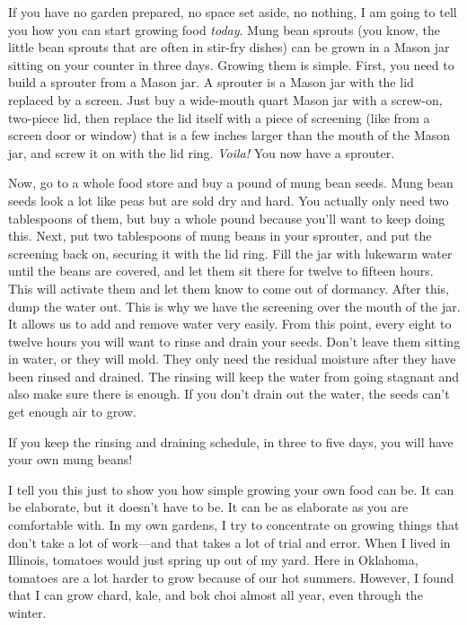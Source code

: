 \begin{infonote}
If you have no garden prepared, no space set aside, no nothing, I am
going to tell you how you can start growing food \textit{today}. Mung
bean sprouts (you know, the little bean sprouts that are often in
stir-fry dishes) can be grown in a Mason jar sitting on your counter in
three days. Growing them is simple. First, you need to build a sprouter
from a Mason jar. A sprouter is a Mason jar with the lid replaced by a
screen. Just buy a wide-mouth quart Mason jar with a screw-on,
two-piece lid, then replace the lid itself with a piece of screening
(like from a screen door or window) that is a few inches larger than
the mouth of the Mason jar, and screw it on with the lid ring.
\textit{Voila!}  You now have a sprouter.

Now, go to a whole food store and buy a pound of mung bean seeds. Mung
bean seeds look a lot like peas but are sold dry and hard. You actually
only need two tablespoons of them, but buy a whole pound because you’ll
want to keep doing this. Next, put two tablespoons of mung beans in
your sprouter, and put the screening back on, securing it with the lid
ring. Fill the jar with lukewarm water until the beans are covered, and
let them sit there for twelve to fifteen hours. This will activate them
and let them know to come out of dormancy. After this, dump the water
out. This is why we have the screening over the mouth of the jar.  It
allows us to add and remove water very easily. From this point, every
eight to twelve hours you will want to rinse and drain your seeds.
Don’t leave them sitting in water, or they will mold. They only need
the residual moisture after they have been rinsed and drained. The
rinsing will keep the water from going stagnant and also make sure
there is enough. If you don’t drain out the water, the seeds can’t get
enough air to grow. 

If you keep the rinsing and draining schedule, in three to five days,
you will have your own mung beans!

I tell you this just to show you how simple growing your own food can
be. It can be elaborate, but it doesn’t have to be. It can be as
elaborate as you are comfortable with. In my own gardens, I try to
concentrate on growing things that don’t take a lot of work—and that
takes a lot of trial and error. When I lived in Illinois, tomatoes
would just spring up out of my yard. Here in Oklahoma, tomatoes are a
lot harder to grow because of our hot summers. However, I found that I
can grow chard, kale, and bok choi almost all year, even through the
winter.
\end{infonote}

